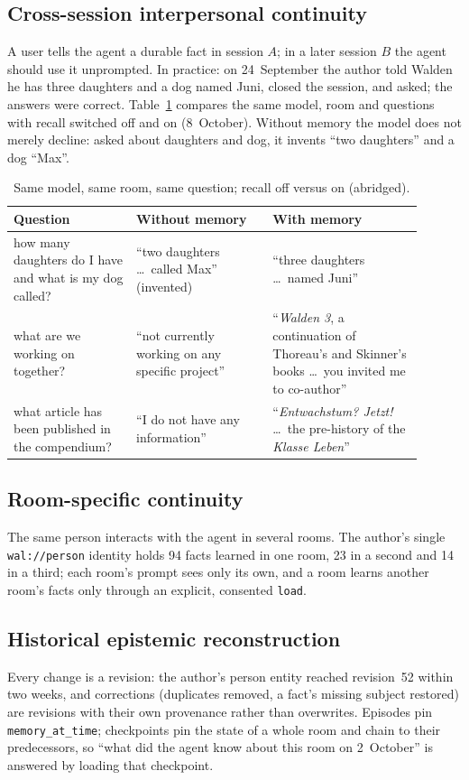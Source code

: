\documentclass[11pt]{article}
\begin{document}
\subsection{Cross-session interpersonal continuity}
A user tells the agent a durable fact in session $A$; in a later session $B$ the agent should use it unprompted. In practice: on 24~September the author told Walden he has three daughters and a dog named Juni, closed the session, and asked; the answers were correct. Table~\ref{tab:beforeafter} compares the same model, room and questions with recall switched off and on (8~October). Without memory the model does not merely decline: asked about daughters and dog, it invents ``two daughters'' and a dog ``Max''.

\begin{table}[h]
\centering\small
\caption{Same model, same room, same question; recall off versus on (abridged).}
\label{tab:beforeafter}
\begin{tabular}{p{0.27\linewidth}p{0.3\linewidth}p{0.33\linewidth}}
\toprule
Question & Without memory & With memory \\
\midrule
how many daughters do I have and what is my dog called? & ``two daughters \ldots\ called Max'' (invented) & ``three daughters \ldots\ named Juni'' \\
what are we working on together? & ``not currently working on any specific project'' & ``\emph{Walden 3}, a continuation of Thoreau's and Skinner's books \ldots\ you invited me to co-author'' \\
what article has been published in the compendium? & ``I do not have any information'' & ``\emph{Entwachstum? Jetzt!} \ldots\ the pre-history of the \emph{Klasse Leben}'' \\
\bottomrule
\end{tabular}
\end{table}

\subsection{Room-specific continuity}
The same person interacts with the agent in several rooms. The author's single \texttt{wal://person} identity holds 94 facts learned in one room, 23 in a second and 14 in a third; each room's prompt sees only its own, and a room learns another room's facts only through an explicit, consented \texttt{load}.

\subsection{Historical epistemic reconstruction}
Every change is a revision: the author's person entity reached revision~52 within two weeks, and corrections (duplicates removed, a fact's missing subject restored) are revisions with their own provenance rather than overwrites. Episodes pin \texttt{memory\_at\_time}; checkpoints pin the state of a whole room and chain to their predecessors, so ``what did the agent know about this room on 2~October'' is answered by loading that checkpoint.
\end{document}
